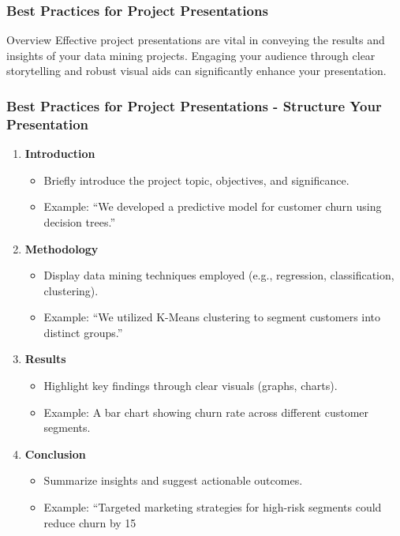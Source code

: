 \documentclass[aspectratio=169]{beamer}
\begin{document}
\begin{frame}[fragile]
  \frametitle{Best Practices for Project Presentations}
  \begin{block}{Overview}
    Effective project presentations are vital in conveying the results and insights of your data mining projects. Engaging your audience through clear storytelling and robust visual aids can significantly enhance your presentation.
  \end{block}
\end{frame}

\begin{frame}[fragile]
  \frametitle{Best Practices for Project Presentations - Structure Your Presentation}
  \begin{enumerate}
    \item \textbf{Introduction}
      \begin{itemize}
        \item Briefly introduce the project topic, objectives, and significance.
        \item Example: ``We developed a predictive model for customer churn using decision trees.''
      \end{itemize}
    \item \textbf{Methodology}
      \begin{itemize}
        \item Display data mining techniques employed (e.g., regression, classification, clustering).
        \item Example: ``We utilized K-Means clustering to segment customers into distinct groups.''
      \end{itemize}
    \item \textbf{Results}
      \begin{itemize}
        \item Highlight key findings through clear visuals (graphs, charts).
        \item Example: A bar chart showing churn rate across different customer segments.
      \end{itemize}
    \item \textbf{Conclusion}
      \begin{itemize}
        \item Summarize insights and suggest actionable outcomes.
        \item Example: ``Targeted marketing strategies for high-risk segments could reduce churn by 15%
      \end{itemize}
  \end{enumerate}
\end{frame}
\end{document}
